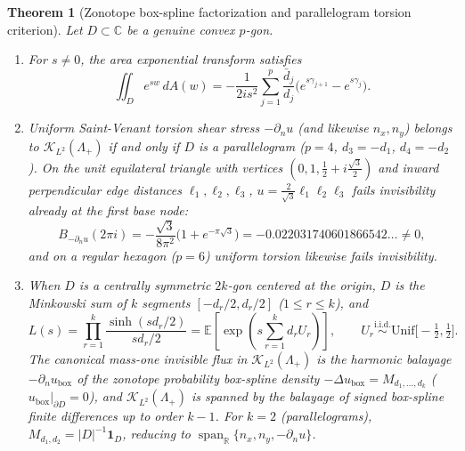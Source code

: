 \documentclass[11pt,reqno]{amsart}
\newtheorem{theorem}{Theorem}[section]
\theoremstyle{definition}
\theoremstyle{remark}
\newcommand{\C}{\mathbb{C}}
\newcommand{\R}{\mathbb{R}}
\begin{document}
\begin{theorem}[Zonotope box-spline factorization and parallelogram torsion criterion]\label{thm:torsion}
Let $D \subset \C$ be a genuine convex $p$-gon.
\begin{enumerate}
  \item For $s \ne 0$, the area exponential transform satisfies
  \begin{equation}\label{eq:stokes-area}
    \iint_D e^{sw}\,dA(w) = -\frac{1}{2 i s^2} \sum_{j=1}^p \frac{\bar d_j}{d_j}\bigl(e^{s\gamma_{j+1}} - e^{s\gamma_j}\bigr).
  \end{equation}
  \item Uniform Saint-Venant torsion shear stress $-\partial_n u$ (and likewise $n_x, n_y$) belongs to $\mathcal{K}_{L^2}(\Lambda_+)$ \emph{if and only if} $D$ is a parallelogram ($p = 4$, $d_3 = -d_1$, $d_4 = -d_2$). On the unit equilateral triangle with vertices $(0, 1, \frac12 + i\frac{\sqrt 3}{2})$ and inward perpendicular edge distances $\ell_1,\ell_2,\ell_3$, $u = \frac{2}{\sqrt 3}\ell_1\ell_2\ell_3$ fails invisibility already at the first base node:
  \begin{equation}\label{eq:tri-torsion-fail}
    B_{-\partial_n u}(2\pi i) = -\frac{\sqrt 3}{8\pi^2}\bigl(1 + e^{-\pi\sqrt 3}\bigr) = -0.022031740601866542\dots \ne 0,
  \end{equation}
  and on a regular hexagon ($p=6$) uniform torsion likewise fails invisibility.
  \item When $D$ is a centrally symmetric $2k$-gon centered at the origin, $D$ is the Minkowski sum of $k$ segments $[-d_r/2, d_r/2]$ ($1 \le r \le k$), and
  \begin{equation}\label{eq:zonotope-L}
    L(s) = \prod_{r=1}^k \frac{\sinh(s d_r/2)}{s d_r/2} = \mathbb{E}\!\left[\exp\!\left(s \sum_{r=1}^k d_r U_r\right)\right],
    \qquad U_r \stackrel{\mathrm{i.i.d.}}{\sim} \mathrm{Unif}\bigl[-\tfrac12, \tfrac12\bigr].
  \end{equation}
  The canonical mass-one invisible flux in $\mathcal{K}_{L^2}(\Lambda_+)$ is the harmonic balayage $-\partial_n u_{\mathrm{box}}$ of the zonotope probability box-spline density $-\Delta u_{\mathrm{box}} = M_{d_1,\dots,d_k}$ ($u_{\mathrm{box}}|_{\partial D}=0$), and $\mathcal{K}_{L^2}(\Lambda_+)$ is spanned by the balayage of signed box-spline finite differences up to order $k-1$. For $k = 2$ (parallelograms), $M_{d_1,d_2} = |D|^{-1}\mathbf{1}_D$, reducing to $\operatorname{span}_\R\{n_x, n_y, -\partial_n u\}$.
\end{enumerate}
\end{theorem}
\end{document}
